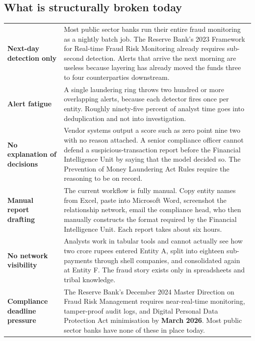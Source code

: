 \documentclass[10pt,a4paper]{article}
\begin{document}
\subsection*{What is structurally broken today}
\begin{tabularx}{\columnwidth}{@{}>{\bfseries\color{ink}}p{3.6cm}X@{}}
\toprule
Next-day detection only & Most public sector banks run their entire fraud monitoring as a nightly batch job. The Reserve Bank's 2023 Framework for Real-time Fraud Risk Monitoring already requires sub-second detection. Alerts that arrive the next morning are useless because layering has already moved the funds three to four counterparties downstream. \\
Alert fatigue & A single laundering ring throws two hundred or more overlapping alerts, because each detector fires once per entity. Roughly ninety-five percent of analyst time goes into deduplication and not into investigation. \\
No explanation of decisions & Vendor systems output a score such as zero point nine two with no reason attached. A senior compliance officer cannot defend a suspicious-transaction report before the Financial Intelligence Unit by saying that the model decided so. The Prevention of Money Laundering Act Rules require the reasoning to be on record. \\
Manual report drafting & The current workflow is fully manual. Copy entity names from Excel, paste into Microsoft Word, screenshot the relationship network, email the compliance head, who then manually constructs the format required by the Financial Intelligence Unit. Each report takes about six hours. \\
No network visibility & Analysts work in tabular tools and cannot actually see how two crore rupees entered Entity A, split into eighteen sub-payments through shell companies, and consolidated again at Entity F. The fraud story exists only in spreadsheets and tribal knowledge. \\
Compliance deadline pressure & The Reserve Bank's December 2024 Master Direction on Fraud Risk Management requires near-real-time monitoring, tamper-proof audit logs, and Digital Personal Data Protection Act minimisation by \textbf{March 2026}. Most public sector banks have none of these in place today. \\
\bottomrule
\end{tabularx}
\end{document}
